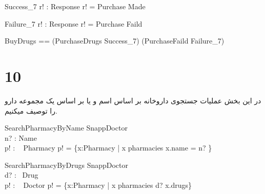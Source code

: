 \documentclass{article}
\begin{document}
\begin{schema}{Success_7}
r! : Response
\where
r! = Purchase Made
\end{schema}

\begin{schema}{Failure_7}
r! : Response
\where
r! = Purchase Faild
\end{schema}

\begin{zed}
BuyDrugs == (PurchaseDrugs \land Success_7) \lor (PurchaseFaild \land Failure_7)
\end{zed}

\section*{10}

در این بخش عملیات جستجوی داروخانه بر اساس اسم و یا بر اساس یک مجموعه دارو را توصیف میکنیم.
\begin{schema}{SearchPharmacyByName}
\Xi SnappDoctor\\
n? : Name\\
p! : \power~ Pharmacy
\where
p! = \{x:Pharmacy | x \in pharmacies \land x.name = n? \}
\end{schema}

\begin{schema}{SearchPharmacyByDrugs}
\Xi SnappDoctor\\
d? : \power~Drug\\
p! : \power~ Doctor
\where
p! = \{x:Pharmacy | x \in pharmacies \land d? \subseteq x.drugs\}
\end{schema}
\end{document}

